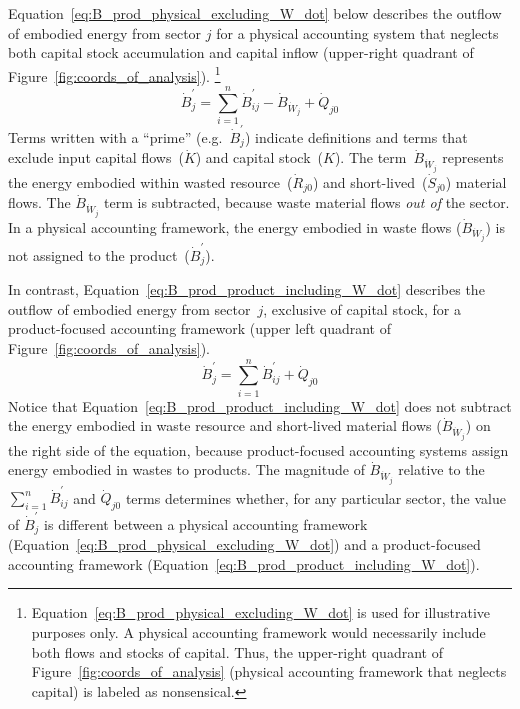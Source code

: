 Equation~\ref{eq:B_prod_physical_excluding_W_dot} below
describes the outflow of embodied energy from sector $j$
for a physical accounting system 
that neglects both capital stock accumulation
and capital inflow (upper-right quadrant of
Figure~\ref{fig:coords_of_analysis}).%
	\footnote{
	Equation~\ref{eq:B_prod_physical_excluding_W_dot} 
	is used for illustrative purposes only. 
	A physical accounting framework would necessarily 
	include both flows and stocks of capital.
	Thus, the upper-right quadrant of Figure~\ref{fig:coords_of_analysis}
	(physical accounting framework that neglects capital)
	is labeled as nonsensical.
	}
%
\begin{equation} \label{eq:B_prod_physical_excluding_W_dot}
	\dot{B}_{j}^{'}
	= \sum\limits_{i=1}^{n} \dot{B}_{ij}^{'} 
	- \dot{B}_{\dot{W}_{j}}
	+ \dot{Q}_{j0}
\end{equation}
%
Terms written with a ``prime''
(e.g.~$\dot{B}_{j}^{'}$) indicate definitions and terms that 
exclude input capital flows~($\dot{K}$) and capital stock~($K$).
The term~$\dot{B}_{\dot{W}_{j}}$ represents the energy embodied 
within wasted resource~($\dot{R}_{j0}$) 
and short-lived~($\dot{S}_{j0}$) material flows.
The $\dot{B}_{\dot{W}_{j}}$ term is subtracted, because waste material flows \emph{out of}
the sector. 
In a physical accounting framework, the energy embodied 
in waste flows ($\dot{B}_{\dot{W}_{j}}$)
is not assigned to the product~($\dot{B}_{j}^{'}$).

In contrast, Equation~\ref{eq:B_prod_product_including_W_dot} describes the outflow 
of embodied energy from sector~$j$,
exclusive of capital stock,
for a product-focused accounting framework 
(upper left quadrant of Figure~\ref{fig:coords_of_analysis}).
%
\begin{equation} \label{eq:B_prod_product_including_W_dot}
	\dot{B}_{j}^{'}
	= \sum\limits_{i=1}^{n} \dot{B}_{ij}^{'} 
	+ \dot{Q}_{j0}
\end{equation}
%
Notice that Equation~\ref{eq:B_prod_product_including_W_dot} 
does not subtract the energy embodied in waste resource and short-lived material
flows ($\dot{B}_{\dot{W}_{j}}$) on the right side of the equation, 
because product-focused accounting systems assign energy embodied in wastes
to products.
The magnitude of $\dot{B}_{\dot{W}_{j}}$ relative to the
$\sum\limits_{i=1}^{n} \dot{B}_{ij}^{'}$ and
$\dot{Q}_{j0}$ terms determines whether, for any particular sector,
the value of $\dot{B}_{j}^{'}$ is different between 
a physical accounting framework 
(Equation~\ref{eq:B_prod_physical_excluding_W_dot})
and a product-focused accounting framework 
(Equation~\ref{eq:B_prod_product_including_W_dot}).


